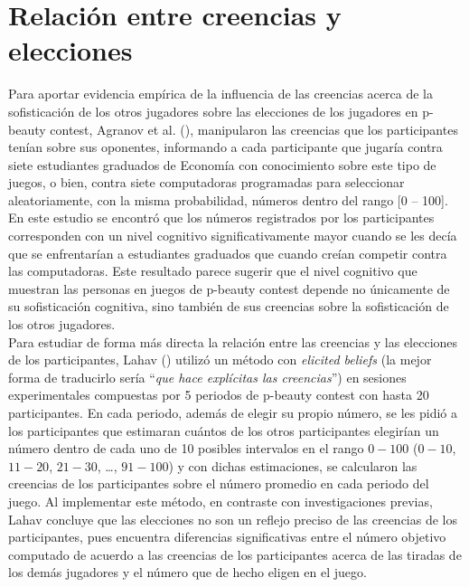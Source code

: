 \section{Relación entre creencias y elecciones}

Para aportar evidencia empírica de la influencia de las creencias acerca de la sofisticación de los otros jugadores sobre las elecciones de los jugadores en p-beauty contest, Agranov et al. (\citeyear{Agranov}), manipularon las creencias que los participantes tenían sobre sus oponentes, informando a cada participante que jugaría contra siete estudiantes graduados de Economía con conocimiento sobre este tipo de juegos, o bien, contra siete computadoras programadas para seleccionar aleatoriamente, con la misma probabilidad,  números dentro del rango [0 – 100]. En este estudio se encontró que los números registrados por los participantes corresponden con un nivel cognitivo significativamente mayor cuando se les decía que se enfrentarían a estudiantes graduados que cuando creían competir contra las computadoras. Este resultado parece sugerir que el nivel cognitivo que muestran las personas en juegos de p-beauty contest depende no únicamente de su sofisticación cognitiva, sino también de sus creencias sobre la sofisticación de los otros jugadores.\\

Para estudiar de forma más directa la relación entre las creencias y las elecciones de los participantes, Lahav (\citeyear{Lahav}) utilizó un método con \textit{elicited beliefs} (la mejor forma de traducirlo sería “\textit{que hace explícitas las creencias}”) en sesiones experimentales compuestas por 5 periodos de p-beauty contest con hasta 20 participantes. En cada periodo, además de elegir su propio número, se les pidió a los participantes que estimaran cuántos de los otros participantes elegirían un número dentro de cada uno de 10 posibles intervalos en el rango $0-100$ ($0-10$, $11-20$, $21-30$, …, $91-100$) y con dichas estimaciones, se calcularon las creencias de los participantes sobre el número promedio en cada periodo del juego. Al implementar este método, en contraste con investigaciones previas, Lahav concluye que las elecciones no son un reflejo preciso de las creencias de los participantes, pues encuentra diferencias significativas entre el número objetivo computado de acuerdo a las creencias de los participantes acerca de las tiradas de los demás jugadores y el número que de hecho eligen en el juego.\\

